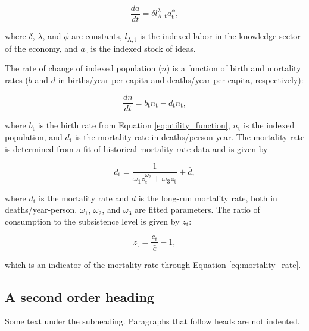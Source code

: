 \documentclass[letterpaper,12pt]{article}
\begin{document}
\begin{equation} \label{eq:da_dt}
	\frac{da}{dt} = \delta l_\mathrm{A,t}^\lambda a_\mathrm{t}^\phi,
\end{equation}

\noindent where $\delta$, $\lambda$, and $\phi$ are constants, $l_\mathrm{A,t}$ is the indexed labor in the knowledge sector of the economy, and $a_\mathrm{t}$ is the indexed stock of ideas.

The rate of change of indexed population ($n$) is a function of birth and mortality rates ($b$ and $d$ in births/year per capita and deaths/year per capita, respectively):

\begin{equation} \label{eq:dn_dt}
	\frac{dn}{dt} = b_\mathrm{t} n_\mathrm{t} - d_\mathrm{t} n_\mathrm{t},
\end{equation}

\noindent where $b_\mathrm{t}$ is the birth rate from Equation \ref{eq:utility_function}, $n_\mathrm{t}$ is the indexed population, and $d_\mathrm{t}$ is the mortality rate in deaths/person-year. The mortality rate is determined from a fit of historical mortality rate data \citep{Jones2001} and is given by

\begin{equation} \label{eq:mortality_rate}
	d_\mathrm{t} = \frac{1}{\omega_\mathrm{1} z_\mathrm{t}^{\omega_\mathrm{2}} + \omega_\mathrm{3} z_\mathrm{t}} + \bar d,
\end{equation}

\noindent where $d_\mathrm{t}$ is the mortality rate and $\bar d$ is the long-run mortality rate, both in deaths/year-person. $\omega_\mathrm{1}$, $\omega_\mathrm{2}$, and $\omega_\mathrm{3}$ are fitted parameters. The ratio of consumption to the subsistence level is given by $z_\mathrm{t}$:

\begin{equation} \label{eq:z}
	z_\mathrm{t} = \frac{c_\mathrm{t}}{\bar c} - 1, 
\end{equation}

\noindent which is an indicator of the mortality rate through Equation \ref{eq:mortality_rate}.


\subsection{A second order heading}

Some text under the subheading. Paragraphs that follow heads are not
indented.
\end{document}
